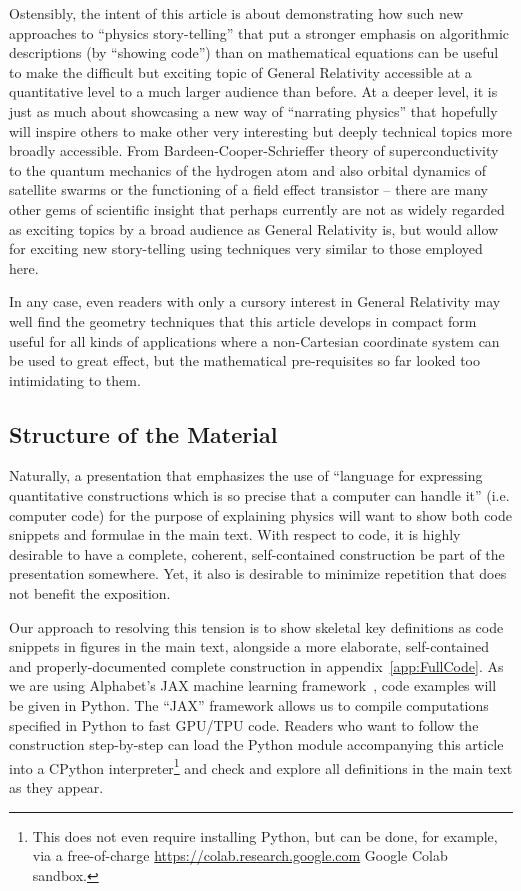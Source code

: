 \documentclass[twocolumn]{article}
\begin{document}
Ostensibly, the intent of this article is about demonstrating how such
new approaches to ``physics story-telling'' that put a stronger
emphasis on algorithmic descriptions (by ``showing code'') than on
mathematical equations can be useful to make the difficult but
exciting topic of General Relativity accessible at a quantitative
level to a much larger audience than before. At a deeper level, it is
just as much about showcasing a new way of ``narrating physics'' that
hopefully will inspire others to make other very interesting but
deeply technical topics more broadly accessible. From
Bardeen-Cooper-Schrieffer theory of superconductivity to the quantum
mechanics of the hydrogen atom and also orbital dynamics of satellite
swarms or the functioning of a field effect transistor -- there are
many other gems of scientific insight that perhaps currently are not
as widely regarded as exciting topics by a broad audience as General
Relativity is, but would allow for exciting new story-telling using
techniques very similar to those employed here.

In any case, even readers with only a cursory interest in General
Relativity may well find the geometry techniques that this article
develops in compact form useful for all kinds of applications where a
non-Cartesian coordinate system can be used to great effect, but the
mathematical pre-requisites so far looked too intimidating to them.

\subsection{Structure of the Material}

Naturally, a presentation that emphasizes the use of ``language for
expressing quantitative constructions which is so precise that a
computer can handle it'' (i.e. computer code) for the purpose of
explaining physics will want to show both code snippets and formulae
in the main text. With respect to code, it is highly desirable to have
a complete, coherent, self-contained construction be part of the
presentation somewhere. Yet, it also is desirable to minimize
repetition that does not benefit the exposition.

Our approach to resolving this tension is to show skeletal key
definitions as code snippets in figures in the main text, alongside
a more elaborate, self-contained and properly-documented complete
construction in appendix~\ref{app:FullCode}. As we are
using Alphabet's JAX machine learning framework~\cite{jax2018}, code
examples will be given in Python. The ``JAX'' framework allows us to
compile computations specified in Python to fast GPU/TPU
code. Readers who want to follow the construction step-by-step can
load the Python module accompanying this article into a CPython
interpreter\footnote{This does not even require installing Python, but
can be done, for example, via a free-of-charge
\url{https://colab.research.google.com} Google Colab sandbox.} and
check and explore all definitions in the main text as they appear.
\end{document}
